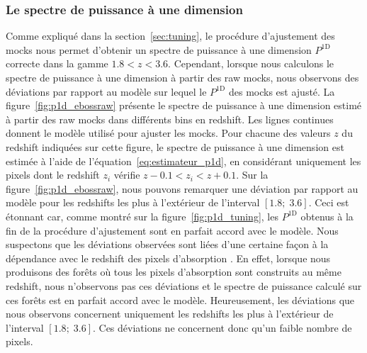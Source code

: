 


\subsubsection{Le spectre de puissance à une dimension}

Comme expliqué dans la section~\ref{sec:tuning}, le procédure d'ajustement des mocks nous permet d'obtenir un spectre de puissance à une dimension $P^{\mathrm{1D}}$ correcte dans la gamme $\num{1.8} < z < \num{3.6}$.
Cependant, lorsque nous calculons le spectre de puissance à une dimension à partir des raw mocks, nous observons des déviations par rapport au modèle sur lequel le $P^{\mathrm{1D}}$ des mocks est ajusté.
La figure~\ref{fig:p1d_ebossraw} présente le spectre de puissance à une dimension estimé à partir des raw mocks dans différents bins en redshift. Les lignes continues donnent le modèle utilisé pour ajuster les mocks. Pour chacune des valeurs $z$ du redshift indiquées sur cette figure, le spectre de puissance à une dimension est estimée à l'aide de l'équation~\ref{eq:estimateur_p1d}, en considérant uniquement les pixels dont le redshift $z_i$ vérifie $z - \num{0.1} < z_i < z + \num{0.1}$.
Sur la figure~\ref{fig:p1d_ebossraw}, nous pouvons remarquer une déviation par rapport au modèle pour les redshifts les plus à l'extérieur de l'interval $[\num{1.8};\;\num{3.6}]$.
Ceci est étonnant car, comme montré sur la figure~\ref{fig:p1d_tuning}, les $P^{\mathrm{1D}}$ obtenus à la fin de la procédure d'ajustement sont en parfait accord avec le modèle.
Nous suspectons que les déviations observées sont liées d'une certaine façon à la dépendance avec le redshift des pixels d'absorption \lya{}. En effet, lorsque nous produisons des forêts où tous les pixels d'absorption sont construits au même redshift, nous n'observons pas ces déviations et le spectre de puissance calculé sur ces forêts est en parfait accord avec le modèle.
Heureusement, les déviations que nous observons concernent uniquement les redshifts les plus à l'extérieur de l'interval $[\num{1.8};\;\num{3.6}]$. Ces déviations ne concernent donc qu'un faible nombre de pixels.

